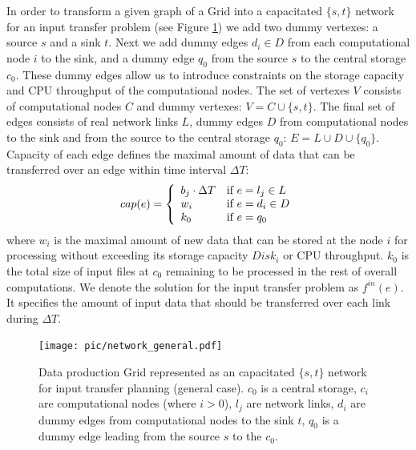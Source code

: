 \documentclass{svjour3}                     %
\begin{document}
In order to transform a given graph of a Grid into a capacitated $\{s,t\}$
network for an input transfer problem (see Figure \ref{network_general}) we add two dummy vertexes: a source $s$
and a sink $t$. Next we add  dummy edges $d_{i} \in D$ from each computational
node $i$ to the sink, and a dummy edge $q_{0}$ from the source $s$ to the
central storage $c_{0}$. These dummy edges allow us to introduce constraints
on the storage capacity and CPU throughput of the computational nodes. The set of vertexes $V$ consists of
computational nodes $C$ and dummy vertexes: $V= C \cup \{s,t\}$. The final set
of edges consists of real network links $L$, dummy edges $D$ from
computational nodes to the sink and from the source to the central storage
$q_{0}$: $E= L \cup D \cup \{q_{0}\}$. Capacity of each edge defines the
maximal amount of data that can be transferred over an edge within time
interval $\Delta T$: 
%
\begin{equation} 
\label{edge_cap} 
cap(e) = \left\{
\begin{array}{l l} 
b_{j} \cdot \Delta T & \text{if }e = l_{j} \in L \\ w_{i} &
\text{if } e = d_{i} \in D\\ k_{0} & \text{if } e = q_{0} 
\end{array} \right.
\end{equation} 
%
where $w_{i}$ is the maximal amount of new data that can be
stored at the node $i$ for processing without exceeding its storage capacity $Disk_{i}$ or CPU throughput. $k_{0}$ is the total size of input files at $c_{0}$ remaining to be processed in the rest of overall computations. We denote the solution for the input transfer problem as $f^{in}(e)$. It specifies the amount of input data that should be transferred over each link during $\Delta T$.
\begin{figure}
	\begin{center}
		\texttt{[image: pic/network\_general.pdf]}
	\end{center}
	\caption{Data production Grid represented as an capacitated $\{s,t\}$ network for input transfer planning (general case). $c_{0}$ is a central storage, $c_{i}$ are computational nodes (where $i>0$), $l_{j}$ are network links, $d_{i}$ are dummy edges from computational nodes to the sink $t$, $q_{0}$ is a dummy edge leading from the source $s$ to the $c_{0}$. }
	\label{network_general}
\end{figure}  
\end{document}
